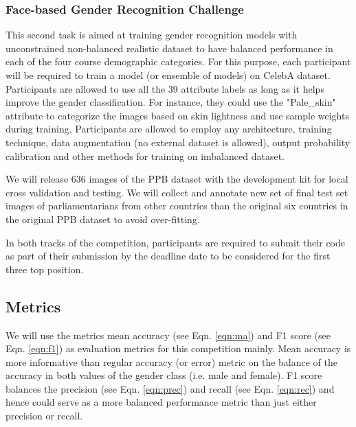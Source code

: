 \documentclass[11pt, oneside]{article}
\begin{document}
\subsubsection{Face-based Gender Recognition Challenge}
This second task is aimed at training gender recognition models with unconstrained non-balanced realistic dataset to have balanced performance in each of the four course demographic categories. For this purpose, each participant will be required to train a model (or ensemble of models) on CelebA dataset. Participants are allowed to use all the 39 attribute labels as long as it helps improve the gender classification. For instance, they could use the "Pale\_skin" attribute to categorize the images based on skin lightness and use sample weights during training. Participants are allowed to employ any architecture, training technique, data augmentation (no external dataset is allowed), output probability calibration and other methods for training on imbalanced dataset.

We will release 636 images of the PPB dataset with the development kit for local cross validation and testing. We will collect and annotate new set of final test set images of parliamentarians from other countries than the original six countries in the original PPB dataset to avoid over-fitting. 

In both tracks of the competition, participants are required to submit their code as part of their submission by the deadline date to be considered for the first three top position.


\subsection{Metrics}
\label{sec:metrics}
We will use the metrics mean accuracy (see Eqn. \ref{eqn:ma}) and F1 score (see Eqn. \ref{eqn:f1}) as evaluation metrics for this competition mainly. Mean accuracy is more informative than regular accuracy (or error) metric on the balance of the accuracy in both values of the gender class (i.e. male and female). F1 score balances the precision (see Eqn. \ref{eqn:prec}) and recall (see Eqn. \ref{eqn:rec}) and hence could serve as a more balanced performance metric than just either precision or recall.
\end{document}
